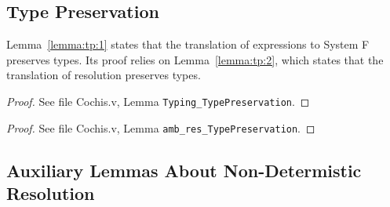 \subsection{Type Preservation}\label{proof:preservation}

Lemma~\ref{lemma:tp:1} states that the translation of expressions to System F preserves
types. Its proof relies on Lemma~\ref{lemma:tp:2}, which states that the translation
of resolution preserves types.

{\centering
{}}
\begin{proof}
	See file Cochis.v, Lemma \texttt{Typing\_TypePreservation}.
\end{proof}

{\centering
{}}
\begin{proof}
	See file Cochis.v, Lemma \texttt{amb\_res\_TypePreservation}.
\end{proof}

\subsection{Auxiliary Lemmas About Non-Determistic Resolution}

